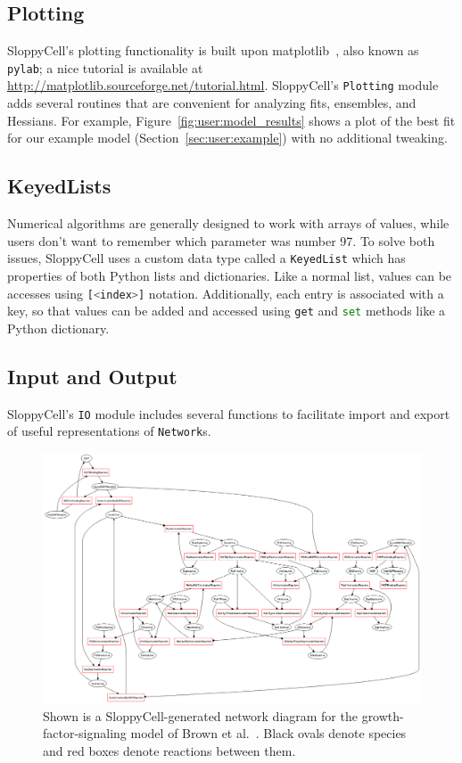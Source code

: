 \documentclass[12pt]{article}
\makeatletter
\newcommand{\py}[1]{\lstinline[language=Python, showstringspaces=False]@#1@}
\makeatother
\begin{document}
\subsection{Plotting}

SloppyCell's plotting functionality is built upon matplotlib~\cite{bib:Hunter2007}, also known as \py{pylab}; a nice tutorial is available at \url{http://matplotlib.sourceforge.net/tutorial.html}.
SloppyCell's \py{Plotting} module adds several routines that are convenient for analyzing fits, ensembles, and Hessians.
For example, Figure~\ref{fig:user:model_results} shows a plot of the best fit for our example model (Section~\ref{sec:user:example}) with no additional tweaking.

\subsection{KeyedLists}
Numerical algorithms are generally designed to work with arrays of values, while users don't want to remember which parameter was number 97.
To solve both issues, SloppyCell uses a custom data type called a \py{KeyedList} which has properties of both Python lists and dictionaries.
Like a normal list, values can be accesses using \py{[<index>]} notation.
Additionally, each entry is associated with a key, so that values can be added and accessed using \py{get} and \py{set} methods like a Python dictionary.

\subsection{Input and Output \label{sec:user:IO}}

SloppyCell's \py{IO} module includes several functions to facilitate import and export of useful representations of \py{Network}s.

\begin{figure}
\begin{center}
\includegraphics[width=\textwidth]{EGFstim100}
\end{center}
\caption[Automatically generated network diagram for G protein model]{Shown is a SloppyCell-generated network diagram for the growth-factor-signaling model of Brown et al.~\cite{bib:Brown2004}. Black ovals denote species and red boxes denote reactions between them.\label{fig:user:dot}}
\end{figure}
\end{document}
